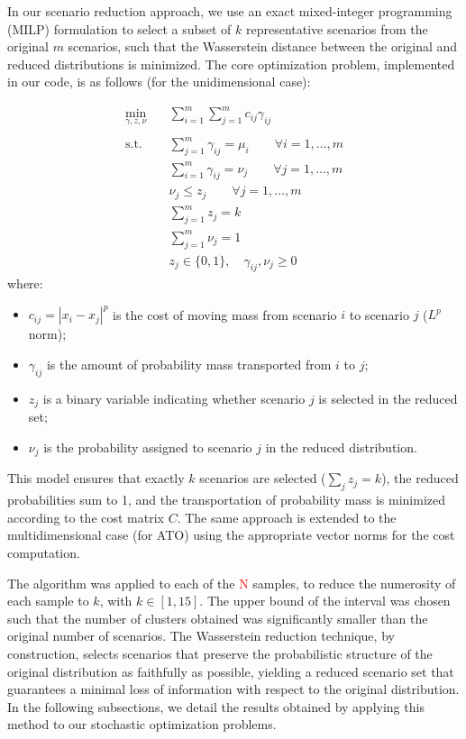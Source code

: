\documentclass[a4paper,12pt]{article}
\begin{document}
	In our scenario reduction approach, we use an exact mixed-integer programming (MILP) formulation to select a subset of $k$ representative scenarios from the original $m$ scenarios, such that the Wasserstein distance between the original and reduced distributions is minimized. The core optimization problem, implemented in our code, is as follows (for the unidimensional case):
	
	\[
	\begin{aligned}
		\min_{\gamma, z, \nu} \quad & \sum_{i=1}^m \sum_{j=1}^m c_{ij} \gamma_{ij} \\\\
		\text{s.t.} \quad
		& \sum_{j=1}^m \gamma_{ij} = \mu_i \qquad \forall i=1,\ldots,m \\
		& \sum_{i=1}^m \gamma_{ij} = \nu_j \qquad \forall j=1,\ldots,m \\
		& \nu_j \leq z_j \qquad \forall j=1,\ldots,m \\
		& \sum_{j=1}^m z_j = k \\
		& \sum_{j=1}^m \nu_j = 1 \\
		& z_j \in \{0,1\}, \quad \gamma_{ij}, \nu_j \geq 0
	\end{aligned}
	\]
	where:
	\begin{itemize}
		\item $c_{ij} = |x_i - x_j|^p$ is the cost of moving mass from scenario $i$ to scenario $j$ ($L^p$ norm);
		\item $\gamma_{ij}$ is the amount of probability mass transported from $i$ to $j$;
		\item $z_j$ is a binary variable indicating whether scenario $j$ is selected in the reduced set;
		\item $\nu_j$ is the probability assigned to scenario $j$ in the reduced distribution.
	\end{itemize}
	
	This model ensures that exactly $k$ scenarios are selected ($\sum_j z_j = k$), the reduced probabilities sum to 1, and the transportation of probability mass is minimized according to the cost matrix $C$. The same approach is extended to the multidimensional case (for ATO) using the appropriate vector norms for the cost computation.
	
	\newpage
	The algorithm was applied to each of the \textcolor{red}{N} samples, to reduce the numerosity of each sample to $k$, with $k \in [1,15]$. The upper bound of the interval was chosen such that the number of clusters obtained was significantly smaller than the original number of scenarios. The Wasserstein reduction technique, by construction, selects scenarios that preserve the probabilistic structure of the original distribution as faithfully as possible, yielding a reduced scenario set that guarantees a minimal loss of information with respect to the original distribution. In the following subsections, we detail the results obtained by applying this method to our stochastic optimization problems. 
	
\end{document}
